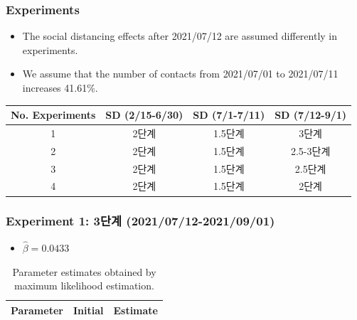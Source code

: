 \documentclass[aspectratio=169, 9pt, xcolor=dvipsnames]{beamer}
\begin{document}
	\begin{frame}\frametitle{Experiments}
	    \begin{itemize}
	    	\item The social distancing effects after 2021/07/12 are assumed differently in experiments.
	    	\item We assume that the number of contacts from 2021/07/01 to 2021/07/11 increases 41.61\%.
	    \end{itemize}
	    \begin{table}
	    	\begin{tabular}{cccc}
	    		\toprule
	    		\textbf{No. Experiments} & \textbf{SD (2/15-6/30)} & \textbf{SD (7/1-7/11)} & \textbf{SD (7/12-9/1)} \\
	    		\midrule
	 			1 & 2단계 & 1.5단계 & \textcolor{NavyBlue}{3단계} \\
	 			2 & 2단계 & 1.5단계 & \textcolor{NavyBlue}{2.5-3단계} \\
	 			3 & 2단계 & 1.5단계 & \textcolor{NavyBlue}{2.5단계} \\
	 			4 & 2단계 & 1.5단계 & \textcolor{NavyBlue}{2단계} \\
	    		\bottomrule
	    	\end{tabular}
	    \end{table}
	\end{frame}

	\begin{frame}\frametitle{Experiment 1: 3단계 (2021/07/12-2021/09/01)}
	    \begin{itemize}
			\item $\hat{\beta} = 0.0433$
		\end{itemize}
	    \begin{table}
	    	\begin{tabular}{crr}
	    		\toprule
	    		\textbf{Parameter} & \textbf{Initial} & \textbf{Estimate} \\
	    		\midrule
	    		
	    		\bottomrule
	    	\end{tabular}
	    	\caption{Parameter estimates obtained by maximum likelihood estimation.}
	    \end{table}
	\end{frame}
\end{document}
